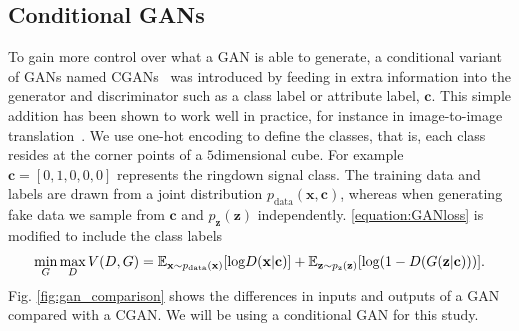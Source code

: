 \documentclass[12pt]{iopart}
\newcommand{\ndimensional}[1]{$#1$\nobreakdash\discretionary{-}{-}{-}dimensional}
\begin{document}
\subsection{Conditional GANs}

%
To gain more control over what a \ac{GAN} is able to generate, a conditional variant
of \acp{GAN} named \acp{CGAN}~\cite{cgan} was introduced by feeding in extra
information into the generator and discriminator such as a class label or
attribute label, $\mathbf{c}$. This simple addition has been shown to work well in practice, for instance in image-to-image translation~\cite{isola2016imagetoimage}. We use one-hot encoding to define the classes, that is, each class resides at the corner points of a \ndimensional{5} cube. For example $\mathbf{c}=[0,1,0,0,0]$ represents the ringdown signal class. The training data and labels are drawn from a joint distribution $p_{\text{data}}(\mathbf{x},\mathbf{c})$, whereas when generating fake data we sample from $\mathbf{c}$ and $p_{\mathbf{z}}(\mathbf{z})$ independently. \cref{equation:GANloss} is modified to include the class labels 
~
\begin{equation}
   \mathop{\text{min}}_{G}  \mathop{\text{max}}_{D} V(D,G) = \mathbb{E}_{\mathbf{x} \sim p_{\text{\text{data}}}(\mathbf{x})} [\text{log} D(\mathbf{x|c})] + \mathbb{E}_{\mathbf{z} \sim p_{\text{z}}(\mathbf{z})} [\text{log}(1-D(G(\mathbf{z|c})))].
 \label{equation:CGANloss}
 \end{equation}
Fig. \ref{fig:gan_comparison} shows the differences in inputs and outputs of a GAN compared with a \ac{CGAN}. We will be using a conditional GAN for this study.
\end{document}
